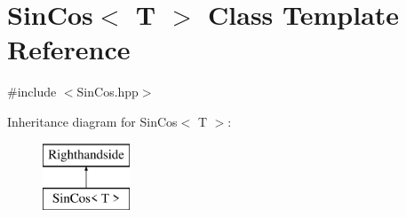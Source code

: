 \hypertarget{class_sin_cos}{}\section{Sin\+Cos$<$ T $>$ Class Template Reference}
\label{class_sin_cos}


{\ttfamily \#include $<$Sin\+Cos.\+hpp$>$}

Inheritance diagram for Sin\+Cos$<$ T $>$\+:\begin{figure}[H]
\begin{center}
\leavevmode
\includegraphics[height=2.000000cm]{class_sin_cos}
\end{center}
\end{figure}
